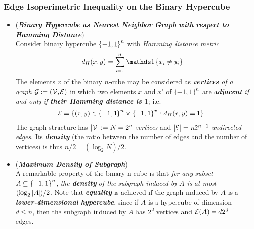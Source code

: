 \documentclass[11pt]{article}
\begin{document}
\subsubsection{Edge Isoperimetric Inequality on the Binary Hypercube}
\begin{itemize}
\item \begin{remark} (\textbf{\emph{Binary Hypercube as Nearest Neighbor Graph with respect to Hamming Distance}})\\
Consider binary hypercube $\left\{-1, 1\right\}^n$ with \emph{Hamming distance metric}
\begin{align*}
d_H(x, y) = \sum_{i=1}^{n}\ind{x_i \neq y_i} 
\end{align*} The elements $x$ of the binary $n$-cube may be considered as \emph{\textbf{vertices} of a graph ${\mathcal G} := ({\mathcal V}, {\mathcal E})$} in which two elements $x$ and $x'$ of  $\left\{-1, 1\right\}^n$ are \emph{\textbf{adjacent}} \emph{if and only if \textbf{their Hamming distance is $1$}}; i.e.
\begin{align*}
{\mathcal E} = \left\{(x,y) \in \left\{-1, 1\right\}^n \times \left\{-1, 1\right\}^n: d_H(x, y) = 1 \right\}.
\end{align*} The graph structure has $\left\lvert {\mathcal V} \right\rvert := N = 2^n$ \emph{vertices} and $\left\lvert {\mathcal E} \right\rvert = n2^{n-1}$ \emph{undirected edges}. Its \emph{\textbf{density}} (the ratio between the number of edges and the number of vertices) is thus $n/2 = (\log_2 N)/2$.
\end{remark}

\item \begin{remark} (\textbf{\emph{Maximum Density of Subgraph}})\\
A remarkable property of the binary n-cube is that \emph{for any subset $A \subseteq \left\{-1, 1\right\}^n$, the \textbf{density} of the subgraph induced by $A$ is at most $(\log_2 \left\lvert A \right\rvert)/2$}.  Note that \emph{\textbf{equality}} is achieved if the graph induced by $A$ is a \emph{\textbf{lower-dimensional hypercube}}, since if $A$ is a hypercube of dimension $d \le n$, then the subgraph induced by $A$ has $2^d$ vertices and ${\mathcal E}(A) = d2^{d-1}$ edges.
\end{remark}


\end{itemize}
\end{document}
